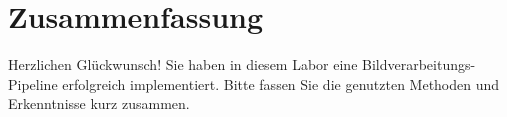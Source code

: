 \newpage
\section{Zusammenfassung}
Herzlichen Gl\"uckwunsch! Sie haben in diesem Labor eine Bildverarbeitungs-Pipeline erfolgreich implementiert. Bitte fassen Sie die genutzten Methoden und Erkenntnisse kurz zusammen.  